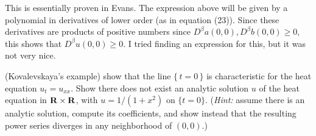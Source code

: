 \begin{solution}
  This is essentially proven in Evans. The expression above will be given
  by a polynomial in derivatives of lower order (as in equation
  (23)). Since these derivatives are products of positive numbers since
  \(D^\beta a(0,0),D^\beta b(0,0)\geq 0\), this shows that \(D^\beta
  u(0,0)\geq 0\). I tried finding an expression for this, but it was not
  very nice.
\end{solution}

\begin{problem}
  (Kovalevskaya's example) show that the line \(\{\,t=0\,\}\) is
  characteristic for the heat equation \(u_t=u_{xx}\). Show there does not
  exist an analytic solution \(u\) of the heat equation in
  \(\mathbf{R}\times\mathbf{R}\), with \(u=1/(1+x^2)\) on \(\{t=0\}\). (\emph{Hint:}
  assume there is an analytic solution, compute its coefficients, and show
  instead that the resulting power series diverges in any neighborhood of
  \((0,0)\).)
\end{problem}
